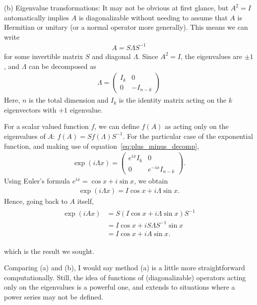 \documentclass{book}
\begin{document}
    (b) Eigenvalue transformations: It may not be obvious at first glance, but $A^2 = I$ automatically implies $A$ is diagonalizable without needing to assume that $A$ is Hermitian or unitary (or a normal operator more generally). This means we can write
    \begin{align}
        A = S \Lambda S^{-1}
    \end{align}
    for some invertible matrix $S$ and diagonal $\Lambda$. Since $A^2 = I$, the eigenvalues are $\pm 1$, and $\Lambda$ can be decomposed as
    \begin{align} \label{eq:plus_minus_decomp}
        \Lambda = \begin{pmatrix}
            I_k & 0 \\
            0 & -I_{n-k}
        \end{pmatrix}
    \end{align}
    Here, $n$ is the total dimension and $I_k$ is the identity matrix acting on the $k$ eigenvectors with $+1$ eigenvalue.
    
    For a scalar valued function $f$, we can define $f(A)$ as acting only on the eigenvalues of $A$: $f(A) = S f(\Lambda) S^{-1}$. For the particular case of the exponential function, and making use of equation~\eqref{eq:plus_minus_decomp},
    \begin{align}
        \exp(i\Lambda x) = \begin{pmatrix}
            e^{i x} I_k & 0 \\
            0 & e^{-ix} I_{n-k}
        \end{pmatrix}.
    \end{align}
    Using Euler's formula $e^{ix} = \cos x + i \sin x$, we obtain
    \begin{align}
        \exp(i \Lambda x) = I \cos x + i \Lambda \sin x. 
    \end{align}
    Hence, going back to $A$ itself,
    \begin{align}
    \begin{aligned}
        \exp(i A x) &= S(I \cos x + i \Lambda \sin x)S^{-1} \\
        &= I \cos x + i S \Lambda S^{-1} \sin x \\
        &= I \cos x + i A \sin x.
    \end{aligned}
    \end{align}
    
    which is the result we sought.
    
    Comparing (a) and (b), I would say method (a) is a little more straightforward computationally. Still, the idea of functions of (diagonalizable) operators acting only on the eigenvalues is a powerful one, and extends to situations where a power series may not be defined. 
\end{document}
